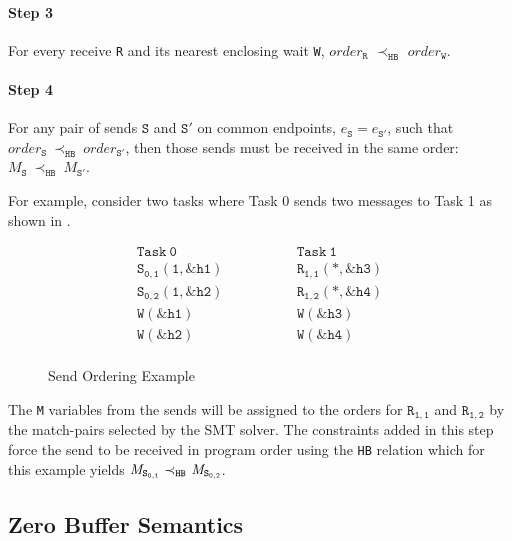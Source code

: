 \paragraph*{Step 3} For every receive \texttt{R} and its nearest
enclosing wait \texttt{W}, $\mathit{order}_\mathtt{R}$
$\prec_\mathtt{HB}$ $\mathit{order}_\mathtt{W}$.

\paragraph*{Step 4} For any pair of sends $\mathtt{S}$ and
$\mathtt{S'}$ on common endpoints, $e_{\mathtt{S}}=e_{\mathtt{S'}}$,
such that
$\mathit{order}_\mathtt{S}\ \mathrm{\prec_\mathtt{HB}}\ \mathit{order}_\mathtt{S'}$,
then those sends must be received in the same order:
$M_{\mathtt{S}}\ \mathrm{\prec_{\mathtt{HB}}}\ M_{\mathtt{S'}}$.

For example, consider two tasks where Task 0 sends two messages to
Task 1 as shown in .

\begin{figure}[h]
\[
\begin{array}{l|l}
\;\;\;\;\;\;\;\;\mathtt{Task\ 0}\;\;\;\;\;\;\;\; & \;\;\;\;\;\;\;\; \mathtt{Task\ 1}\;\;\;\;\;\;\;\; \\
\hline
\;\;\;\;\;\;\;\;\mathtt{S_{0,1}(1,\&h1)}\;\;\;\;\;\;\;\; & \;\;\;\;\;\;\;\; \mathtt{R_{1,1}(*,\&h3)}\;\;\;\;\;\;\;\; \\
\;\;\;\;\;\;\;\;\mathtt{S_{0,2}(1,\&h2)}\;\;\;\;\;\;\;\; & \;\;\;\;\;\;\;\; \mathtt{R_{1,2}(*,\&h4)}\;\;\;\;\;\;\;\; \\
\;\;\;\;\;\;\;\;\mathtt{W(\&h1)}\;\;\;\;\;\;\;\; & \;\;\;\;\;\;\;\; \mathtt{W(\&h3)}\;\;\;\;\;\;\;\; \\
\;\;\;\;\;\;\;\;\mathtt{W(\&h2)}\;\;\;\;\;\;\;\; & \;\;\;\;\;\;\;\; \mathtt{W(\&h4)}\;\;\;\;\;\;\;\; \\
\end{array}
\]
\caption{Send Ordering Example} \label{fig:step4}
\end{figure}

The \texttt{M} variables from the sends will be assigned to the orders
for $\mathtt{R_{1,1}}$ and $\mathtt{R_{1,2}}$ by the match-pairs
selected by the SMT solver. The constraints added in this step force
the send to be received in program order using the \texttt{HB}
relation which for this example yields
$\cfgnt{M}_\mathtt{S_{0,1}}\ \mathrm{\prec_\mathtt{HB}}\ \cfgnt{M}_\mathtt{S_{0,2}}$.

\subsection{Zero Buffer Semantics}


